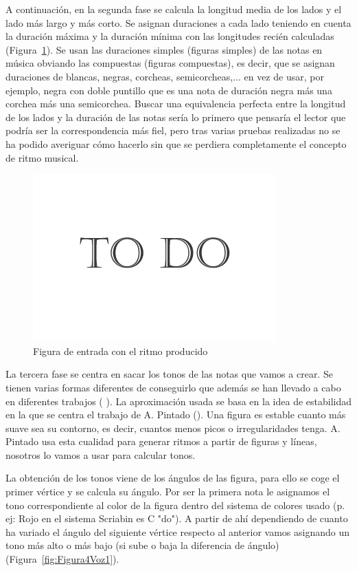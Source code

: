A continuación, en la segunda fase se calcula la longitud media de los lados y el lado más largo y más corto. Se asignan duraciones a cada lado teniendo en cuenta la duración máxima y la duración mínima con las longitudes recién calculadas (Figura~\ref{fig:Figura2Voz1}). Se usan las duraciones simples (figuras simples) de las notas en música obviando las compuestas (figuras compuestas), es decir, que se asignan duraciones de blancas, negras, corcheas, semicorcheas,... en vez de usar, por ejemplo, negra con doble puntillo que es una nota de duración negra más una corchea más una semicorchea. Buscar una equivalencia perfecta entre la longitud de los lados y la duración de las notas sería lo primero que pensaría el lector que podría ser la correspondencia más fiel, pero tras varias pruebas realizadas no se ha podido averiguar cómo hacerlo sin que se perdiera completamente el concepto de ritmo musical.

		\begin{figure}[htbp]
		\centering
		\hspace*{0.0in}
		\includegraphics[scale=0.57]{graphics/todo.png}
		\caption{Figura de entrada con el ritmo producido}
		\label{fig:Figura2Voz1}
		\end{figure}

La tercera fase se centra en sacar los tonos de las notas que vamos a crear. Se tienen varias formas diferentes de conseguirlo que además se han llevado a cabo en diferentes trabajos (\cite{bricksConvertsMusic} \cite{ImageBaseComposition}). La aproximación usada se basa en la idea de estabilidad en la que se centra el trabajo de A. Pintado (\cite{portutesis}). Una figura es estable cuanto más suave sea su contorno, es decir, cuantos menos picos o irregularidades tenga. A. Pintado usa esta cualidad para generar ritmos a partir de figuras y líneas, nosotros lo vamos a usar para calcular tonos.

La obtención de los tonos viene de los ángulos de las figura, para ello se coge el primer vértice y se calcula su ángulo. Por ser la primera nota le asignamos el tono correspondiente al color de la figura dentro del sistema de colores usado (p. ej: Rojo en el sistema Scriabin es C "do"). A partir de ahí dependiendo de cuanto ha variado el ángulo del siguiente vértice respecto al anterior vamos asignando un tono más alto o más bajo (si sube o baja la diferencia de ángulo) (Figura~\ref{fig:Figura4Voz1}).

